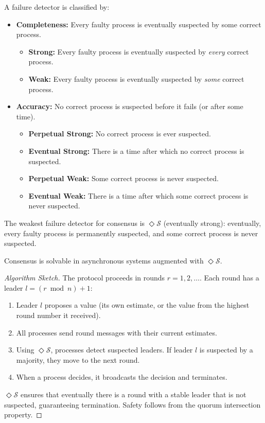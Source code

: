\begin{definition}
A failure detector is classified by:
\begin{itemize}
\item \textbf{Completeness:} Every faulty process is eventually suspected by some correct process.
\begin{itemize}
\item \textbf{Strong:} Every faulty process is eventually suspected by \emph{every} correct process.
\item \textbf{Weak:} Every faulty process is eventually suspected by \emph{some} correct process.
\end{itemize}
\item \textbf{Accuracy:} No correct process is suspected before it fails (or after some time).
\begin{itemize}
\item \textbf{Perpetual Strong:} No correct process is ever suspected.
\item \textbf{Eventual Strong:} There is a time after which no correct process is suspected.
\item \textbf{Perpetual Weak:} Some correct process is never suspected.
\item \textbf{Eventual Weak:} There is a time after which some correct process is never suspected.
\end{itemize}
\end{itemize}
The weakest failure detector for consensus is $\Diamond \mathcal{S}$ (eventually strong): eventually, every faulty process is permanently suspected, and some correct process is never suspected.
\end{definition}

\begin{theorem}
Consensus is solvable in asynchronous systems augmented with $\Diamond \mathcal{S}$.
\end{theorem}

\begin{proof}[Algorithm Sketch]
The protocol proceeds in rounds $r = 1, 2, \ldots$. Each round has a leader $l = (r \bmod n) + 1$:
\begin{enumerate}
\item Leader $l$ proposes a value (its own estimate, or the value from the highest round number it received).
\item All processes send round messages with their current estimates.
\item Using $\Diamond \mathcal{S}$, processes detect suspected leaders. If leader $l$ is suspected by a majority, they move to the next round.
\item When a process decides, it broadcasts the decision and terminates.
\end{enumerate}
$\Diamond \mathcal{S}$ ensures that eventually there is a round with a stable leader that is not suspected, guaranteeing termination. Safety follows from the quorum intersection property.
\end{proof}

